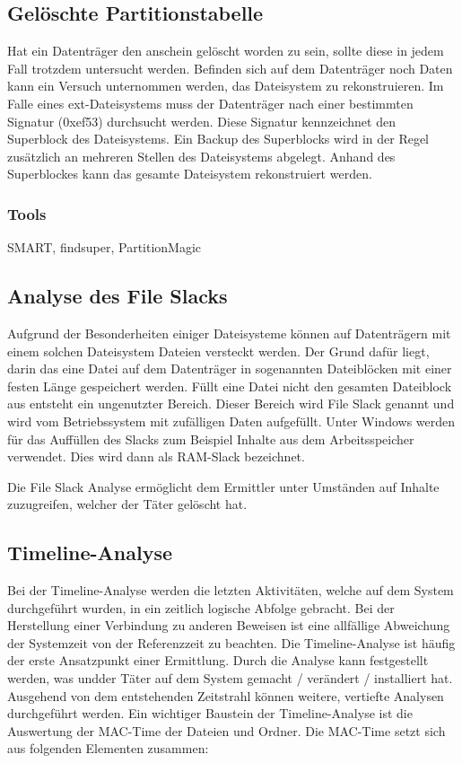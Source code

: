 \subsection{Gelöschte Partitionstabelle}
Hat ein Datenträger den anschein gelöscht worden zu sein, sollte diese in jedem Fall trotzdem untersucht werden. Befinden sich auf dem Datenträger noch Daten kann ein Versuch unternommen werden, das Dateisystem zu rekonstruieren. Im Falle eines ext-Dateisystems muss der Datenträger nach einer bestimmten Signatur (0xef53) durchsucht werden. Diese Signatur kennzeichnet den Superblock des Dateisystems. Ein Backup des Superblocks wird in der Regel zusätzlich an mehreren Stellen des Dateisystems abgelegt. Anhand des Superblockes kann das gesamte Dateisystem rekonstruiert werden.

\subsubsection{Tools}
SMART, findsuper, PartitionMagic


\subsection{Analyse des File Slacks}
Aufgrund der Besonderheiten einiger Dateisysteme können auf Datenträgern mit einem solchen Dateisystem Dateien versteckt werden. Der Grund dafür liegt, darin das eine Datei auf dem Datenträger in sogenannten Dateiblöcken mit einer festen Länge gespeichert werden. Füllt eine Datei nicht den gesamten Dateiblock aus entsteht ein ungenutzter Bereich. Dieser Bereich wird File Slack genannt und wird vom Betriebssystem mit zufälligen Daten aufgefüllt. Unter Windows werden für das Auffüllen des Slacks zum Beispiel Inhalte aus dem Arbeitsspeicher verwendet. Dies wird dann als RAM-Slack bezeichnet.


Die File Slack Analyse ermöglicht dem Ermittler unter Umständen auf Inhalte zuzugreifen, welcher der Täter gelöscht hat.

\subsection{Timeline-Analyse}
Bei der Timeline-Analyse werden die letzten Aktivitäten, welche auf dem System durchgeführt wurden, in ein zeitlich logische Abfolge gebracht. Bei der Herstellung einer Verbindung zu anderen Beweisen ist eine allfällige Abweichung der Systemzeit von der Referenzzeit zu beachten. Die Timeline-Analyse ist häufig der erste Ansatzpunkt einer Ermittlung. Durch die Analyse kann festgestellt werden, was undder Täter auf dem System gemacht / verändert / installiert hat. Ausgehend von dem entstehenden Zeitstrahl können weitere, vertiefte Analysen durchgeführt werden. Ein wichtiger Baustein der Timeline-Analyse ist die Auswertung der MAC-Time der Dateien und Ordner. Die MAC-Time setzt sich aus folgenden Elementen zusammen:

